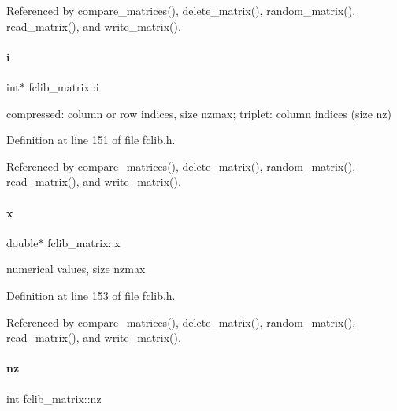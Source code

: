 Referenced by compare\+\_\+matrices(), delete\+\_\+matrix(), random\+\_\+matrix(), read\+\_\+matrix(), and write\+\_\+matrix().

\mbox{\label{structfclib__matrix_aed86c681657206e7502450e437dba667}} 
\paragraph{\texorpdfstring{i}{i}}
{\footnotesize\ttfamily int$\ast$ fclib\+\_\+matrix\+::i}



compressed\+: column or row indices, size nzmax; triplet\+: column indices (size nz) 



Definition at line 151 of file fclib.\+h.



Referenced by compare\+\_\+matrices(), delete\+\_\+matrix(), random\+\_\+matrix(), read\+\_\+matrix(), and write\+\_\+matrix().

\mbox{\label{structfclib__matrix_aba1891f51a81f973249456c91715e06d}} 
\paragraph{\texorpdfstring{x}{x}}
{\footnotesize\ttfamily double$\ast$ fclib\+\_\+matrix\+::x}



numerical values, size nzmax 



Definition at line 153 of file fclib.\+h.



Referenced by compare\+\_\+matrices(), delete\+\_\+matrix(), random\+\_\+matrix(), read\+\_\+matrix(), and write\+\_\+matrix().

\mbox{\label{structfclib__matrix_a7d64a7cddc93a8e1f96ab32e9afe0bbb}} 
\paragraph{\texorpdfstring{nz}{nz}}
{\footnotesize\ttfamily int fclib\+\_\+matrix\+::nz}




